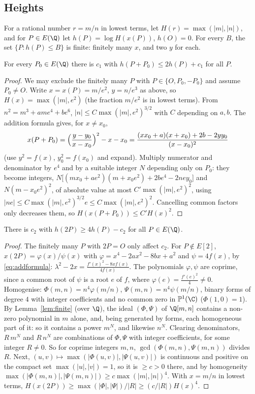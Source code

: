 \subsection*{Heights}

For a rational number $r=m/n$ in lowest terms, let $H(r)=\max(|m|,|n|)$, and for $P\in E(\Q)$ let $h(P)=\log H(x(P))$, $h(O)=0$. For every $B$, the set
$\{P:h(P)\le B\}$ is finite: finitely many $x$, and two $y$ for each.

\begin{lemma}\label{lem:heightadd}
For every $P_0\in E(\Q)$ there is $c_1$ with $h(P+P_0)\le2h(P)+c_1$ for all $P$.
\end{lemma}
\begin{proof}
We may exclude the finitely many $P$ with $P\in\{O,P_0,-P_0\}$ and assume $P_0\ne O$. Write $x=x(P)=m/e^2$, $y=n/e^3$ as above, so $H(x)=\max(|m|,e^2)$ (the
fraction $m/e^2$ is in lowest terms). From $n^2=m^3+ame^4+be^6$, $|n|\le C\max(|m|,e^2)^{3/2}$ with $C$ depending on $a,b$. The addition formula gives, for $x\ne x_0$,
\[
x(P+P_0)=\Bigl(\frac{y-y_0}{x-x_0}\Bigr)^2-x-x_0=\frac{(xx_0+a)(x+x_0)+2b-2yy_0}{(x-x_0)^2}
\]
(use $y^2=f(x)$, $y_0^2=f(x_0)$ and expand). Multiply numerator and denominator by $e^4$ and by a suitable integer $N$ depending only on $P_0$: they become integers,
$N\bigl[(mx_0+ae^2)(m+x_0e^2)+2be^4-2ney_0\bigr]$ and $N(m-x_0e^2)^2$, of absolute value at most $C'\max(|m|,e^2)^2$, using $|ne|\le C\max(|m|,e^2)^{3/2}e\le
C\max(|m|,e^2)^2$. Cancelling common factors only decreases them, so $H(x(P+P_0))\le C'H(x)^2$.
\end{proof}

\begin{lemma}\label{lem:heightdouble}
There is $c_2$ with $h(2P)\ge4h(P)-c_2$ for all $P\in E(\Q)$.
\end{lemma}
\begin{proof}
The finitely many $P$ with $2P=O$ only affect $c_2$. For $P\notin E[2]$, $x(2P)=\varphi(x)/\psi(x)$ with $\varphi=x^4-2ax^2-8bx+a^2$ and $\psi=4f(x)$, by \eqref{eq:addformula}: $\lambda^2-2x=\frac{f'(x)^2-8xf(x)}{4f(x)}$.
The polynomials $\varphi,\psi$ are coprime, since a common root of $\psi$ is a root $e$ of $f$, where $\varphi(e)=\frac{f'(e)^2}4\ne0$. Homogenise: $\Phi(m,n)=n^4\varphi(m/n)$,
$\Psi(m,n)=n^4\psi(m/n)$, binary forms of degree $4$ with integer coefficients and no common zero in $\mathbb P^1(\C)$ ($\Phi(1,0)=1$). By Lemma~\ref{lem:finite}
(over $\Q$), the ideal $(\Phi,\Psi)$ of $\Q[m,n]$ contains a non-zero polynomial in $m$ alone, and, being generated by forms, each homogeneous part of it: so it
contains a power $m^N$, and likewise $n^N$. Clearing denominators, $R\,m^N$ and $R\,n^N$ are combinations of $\Phi,\Psi$ with integer coefficients, for some
integer $R\ne0$. So for coprime integers $m,n$, $\gcd(\Phi(m,n),\Psi(m,n))$ divides $R$. Next, $(u,v)\mapsto\max(|\Phi(u,v)|,|\Psi(u,v)|)$ is continuous and positive on
the compact set $\max(|u|,|v|)=1$, so it is $\ge c>0$ there, and by homogeneity $\max(|\Phi(m,n)|,|\Psi(m,n)|)\ge c\max(|m|,|n|)^4$. With $x=m/n$ in lowest
terms, $H(x(2P))\ge\max(|\Phi|,|\Psi|)/|R|\ge(c/|R|)H(x)^4$.
\end{proof}

